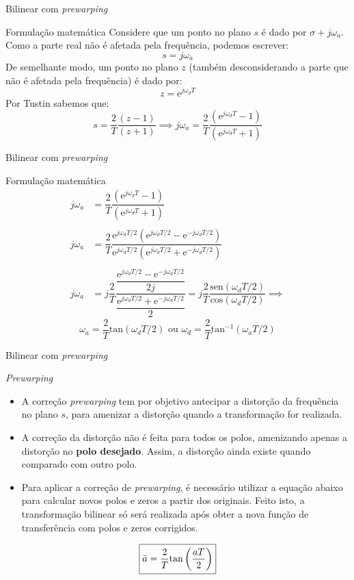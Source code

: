 \begin{frame}{Bilinear com \textit{prewarping}}
\begin{block}{Formulação matemática}
Considere que um ponto no plano $s$ é dado por $\sigma + j\omega_a$. Como a parte real não é afetada pela frequência, podemos escrever:
$$s = j\omega_a$$
De semelhante modo, um ponto no plano $z$ (também desconsiderando a parte que não é afetada pela frequência) é dado por:
$$z = \text{e}^{j\omega_dT}$$
Por Tustin sabemos que:
$$s=\dfrac{2}{T}\dfrac{(z-1)}{(z+1)} \implies
j\omega_a = \dfrac{2}{T}\dfrac{(\text{e}^{j\omega_dT}-1)}{(\text{e}^{j\omega_dT}+1)}$$
\end{block}
\end{frame}

\begin{frame}{Bilinear com \textit{prewarping}}
\begin{block}{Formulação matemática}
\begin{align*}
    j\omega_a &= \dfrac{2}{T}\dfrac{(\text{e}^{j\omega_dT}-1)}{(\text{e}^{j\omega_dT}+1)} \\ \\
    j\omega_a &= \dfrac{2}{T}\dfrac{\text{e}^{j\omega_dT/2}(\text{e}^{j\omega_dT/2}-\text{e}^{-j\omega_dT/2})}{\text{e}^{j\omega_dT/2}(\text{e}^{j\omega_dT/2}+\text{e}^{-j\omega_dT/2})} \\ \\
    j\omega_a &= j\dfrac{2}{T}\dfrac{\dfrac{\text{e}^{j\omega_dT/2}-\text{e}^{-j\omega_dT/2}}{2j}}{\dfrac{\text{e}^{j\omega_dT/2}+\text{e}^{-j\omega_dT/2}}{2}} = j\dfrac{2}{T}\dfrac{\text{sen}(\omega_dT/2)}{\text{cos}(\omega_dT/2)} \implies
\end{align*}
$$\boxed{\omega_a = \dfrac{2}{T}\text{tan}(\omega_dT/2)} \text{ ou } \boxed{\omega_d = \dfrac{2}{T}\text{tan}^{-1}(\omega_aT/2)}$$
\end{block}
\end{frame}

\begin{frame}{Bilinear com \textit{prewarping}}
\begin{block}{\textit{Prewarping}}
\begin{itemize}
    \item A correção \textit{prewarping} tem por objetivo antecipar a distorção da frequência no plano $s$, para amenizar a distorção quando a transformação for realizada. 
    \item A correção da distorção não é feita para todos os polos, amenizando apenas a distorção no \textbf{polo desejado}. Assim, a distorção ainda existe quando comparado com outro polo.
    \item Para aplicar a correção de \textit{prewarping}, é necessário utilizar a equação abaixo para calcular novos polos e zeros a partir dos originais. Feito isto, a transformação bilinear só será realizada após obter a nova função de transferência com polos e zeros corrigidos.
\end{itemize}
$$\boxed{\Bar{a} = \dfrac{2}{T} \text{tan} \left(\dfrac{aT}{2}\right)}$$
\end{block}
\end{frame}

